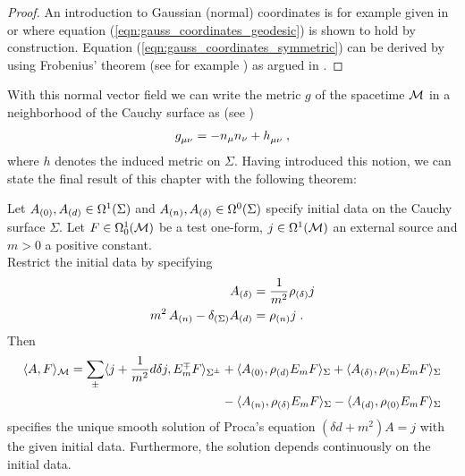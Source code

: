 \begin{proof}
	An introduction to Gaussian (normal) coordinates is for example given in \cite[pp. 42,43]{wald_GR} or \cite[pp. 445,446]{carroll_spacetime-and-gr} where equation (\ref{eqn:gauss_coordinates_geodesic}) is shown to hold by construction. Equation (\ref{eqn:gauss_coordinates_symmetric}) can be derived by using Frobenius' theorem (see for example \cite[Theorem B.3.1 and B.3.2]{wald_GR}) as argued in \cite[Section 2.3.2 Equation 5]{Sanders}.
\end{proof}
With this normal vector field we can write the metric $g$ of the spacetime $\mathcal{M}$ in a neighborhood of the Cauchy surface as (see \cite[Equation 10.2.10]{wald_GR})
\begin{align}
g\indices{_{\mu\nu}} = - n_\mu n_\nu + h\indices{_{\mu\nu}} \formspace,
\end{align}
where $h$ denotes the induced metric on $\Sigma$.
Having introduced this notion, we can state the final result of this chapter with the following theorem:
%
%
%
\begin{theorem} \label{thm:solution_proca_constrained}
 Let ${A_{(0)}},{A_{(d)}} \in \Omega^1(\Sigma)$ and ${A_{(n)}}, {A_{(\delta)}} \in \Omega^0(\Sigma)$ specify initial data on the Cauchy surface $\Sigma$. Let $F \in \Omega^1_0(\mathcal{M})$ be a test one-form, $j \in \Omega^1(\mathcal{M})$ an external source and $m > 0$ a positive constant.\\
 Restrict the initial data by specifying
 \begin{subequations}\label{eqn:proca_constraints}
  \begin{align}
 {A_{(\delta)}} &= \frac{1}{m^2} \rho_{(\delta)} j \\
 m^2 \, {A_{(n)}} - \delta_{(\Sigma)}{A_{(d)}} &= \rho_{(n)} j  \;.
 \end{align}
 \end{subequations}
 Then
 \begin{align}
  \langle A, F \rangle_{\mathcal{M}} = \sum\limits_\pm \langle j + \frac{1}{m^2}d\delta j, E_m^\mp F   \rangle_{\Sigma^\pm}
  &+ \langle {A_{(0)}} , \rho_{(d)} E_m F \rangle_\Sigma
  + \langle {A_{(\delta)}} , \rho_{(n)} E_m F \rangle_\Sigma \notag \\
  &- \langle {A_{(n)}} , \rho_{(\delta)} E_m F \rangle_\Sigma
  - \langle {A_{(d)}} , \rho_{(0)} E_m F \rangle_\Sigma \label{eqn:solution_proca_constrained}
 \end{align}
specifies the unique smooth solution of Proca's equation $\left( \delta d + m^2 \right) A = j$ with the given initial data. Furthermore,  the solution depends continuously on the initial data.
\end{theorem}
